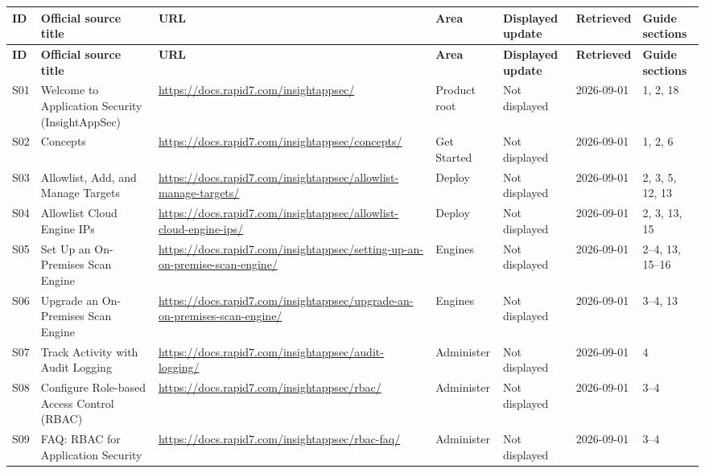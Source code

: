 \documentclass[11pt,letterpaper,oneside]{scrreprt}
\begin{document}
\begin{landscape}
\tiny
\setlength{\tabcolsep}{3pt}
\begin{longtable}{@{}P{0.34in}P{1.40in}P{3.00in}P{0.95in}P{0.75in}P{0.72in}P{1.55in}@{}}
\toprule
\textbf{ID} & \textbf{Official source title} & \textbf{URL} & \textbf{Area} & \textbf{Displayed update} & \textbf{Retrieved} & \textbf{Guide sections}\\
\midrule
\endfirsthead
\toprule
\textbf{ID} & \textbf{Official source title} & \textbf{URL} & \textbf{Area} & \textbf{Displayed update} & \textbf{Retrieved} & \textbf{Guide sections}\\
\midrule
\endhead
\bottomrule
\endfoot
\label{src:S01}S01 & Welcome to Application Security (InsightAppSec) & \url{https://docs.rapid7.com/insightappsec/} & Product root & Not displayed & 2026-09-01 & 1, 2, 18\\
\label{src:S02}S02 & Concepts & \url{https://docs.rapid7.com/insightappsec/concepts/} & Get Started & Not displayed & 2026-09-01 & 1, 2, 6\\
\label{src:S03}S03 & Allowlist, Add, and Manage Targets & \url{https://docs.rapid7.com/insightappsec/allowlist-manage-targets/} & Deploy & Not displayed & 2026-09-01 & 2, 3, 5, 12, 13\\
\label{src:S04}S04 & Allowlist Cloud Engine IPs & \url{https://docs.rapid7.com/insightappsec/allowlist-cloud-engine-ips/} & Deploy & Not displayed & 2026-09-01 & 2, 3, 13, 15\\
\label{src:S05}S05 & Set Up an On-Premises Scan Engine & \url{https://docs.rapid7.com/insightappsec/setting-up-an-on-premise-scan-engine/} & Engines & Not displayed & 2026-09-01 & 2--4, 13, 15--16\\
\label{src:S06}S06 & Upgrade an On-Premises Scan Engine & \url{https://docs.rapid7.com/insightappsec/upgrade-an-on-premises-scan-engine/} & Engines & Not displayed & 2026-09-01 & 3--4, 13\\
\label{src:S07}S07 & Track Activity with Audit Logging & \url{https://docs.rapid7.com/insightappsec/audit-logging/} & Administer & Not displayed & 2026-09-01 & 4\\
\label{src:S08}S08 & Configure Role-based Access Control (RBAC) & \url{https://docs.rapid7.com/insightappsec/rbac/} & Administer & Not displayed & 2026-09-01 & 3--4\\
\label{src:S09}S09 & FAQ: RBAC for Application Security & \url{https://docs.rapid7.com/insightappsec/rbac-faq/} & Administer & Not displayed & 2026-09-01 & 3--4\\

\end{longtable}
\end{landscape}
\end{document}
